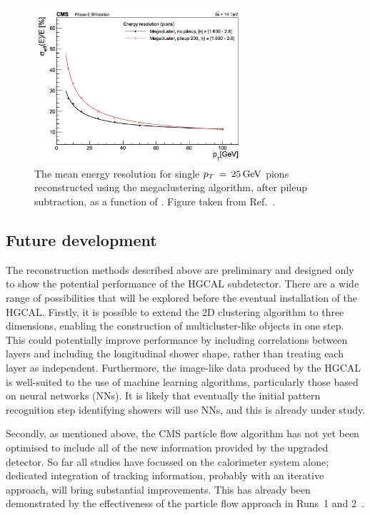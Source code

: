 \begin{figure}[h!]
  \centering
  \includegraphics[width=0.7\textwidth]{Figures/HGCAL/MegaclusterVsPt.png}
  \caption[HGCAL pion energy resolution as a function of \pt.]
  {
    The mean energy resolution for single $p_T\,=\,\SI{25}{GeV}$ pions 
    reconstructed using the megaclustering algorithm, after pileup subtraction, 
    as a function of \pt. 
    Figure taken from Ref.~\cite{HGCAL}.
  }
  \label{fig:hgcal_MegaclusterVsPt}
\end{figure}

\subsection{Future development}
The reconstruction methods described above are preliminary and designed only to show the potential performance of the HGCAL subdetector.
There are a wide range of possibilities that will be explored before the eventual installation of the HGCAL.
Firstly, it is possible to extend the 2D clustering algorithm to three dimensions, enabling the construction of multicluster-like objects in one step.
This could potentially improve performance by including correlations between layers and including the longitudinal shower shape, 
rather than treating each layer as independent.
Furthermore, the image-like data produced by the HGCAL is well-suited to the use of machine learning algorithms, particularly those based on neural networks (NNs).
It is likely that eventually the initial pattern recognition step identifying showers will use NNs, and this is already under study.

Secondly, as mentioned above, the CMS particle flow algorithm has not yet been optimised to include all of the new information provided by the upgraded detector.
So far all studies have focussed on the calorimeter system alone; dedicated integration of tracking information, 
probably with an iterative approach, will bring substantial improvements.
This has already been demonstrated by the effectiveness of the particle flow approach in Runs~1 and 2~\cite{ParticleFlow}.

